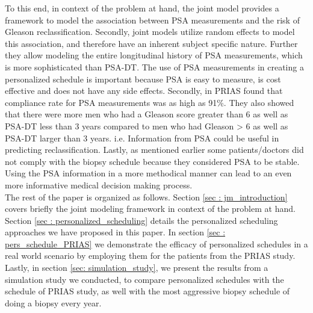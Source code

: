 To this end, in context of the problem at hand, the joint model provides a framework to model the association between PSA measurements and the risk of Gleason reclassification. Secondly, joint models utilize random effects to model this association, and therefore have an inherent subject specific nature. Further they allow modeling the entire longitudinal history of PSA measurements, which is more sophisticated than PSA-DT. The use of PSA measurements in creating a personalized schedule is important because PSA is easy to measure, is cost effective and does not have any side effects. Secondly, in PRIAS \cite{bokhorst2015compliance} found that compliance rate for PSA measurements was as high as 91\%. They also showed that there were more men who had a Gleason score greater than 6 as well as PSA-DT less than 3 years compared to men who had Gleason > 6 as well as PSA-DT larger than 3 years. i.e. Information from PSA could be useful in predicting reclassification. Lastly, as mentioned earlier some patients/doctors did not comply with the biopsy schedule because they considered PSA to be stable. Using the PSA information in a more methodical manner can lead to an even more informative medical decision making process.\\

The rest of the paper is organized as follows. Section \ref{sec : jm_introduction} covers briefly the joint modeling framework in context of the problem at hand. Section \ref{sec : personalized_scheduling} details the personalized scheduling approaches we have proposed in this paper. In section \ref{sec : pers_schedule_PRIAS} we demonstrate the efficacy of personalized schedules in a real world scenario by employing them for the patients from  the PRIAS study. Lastly, in section \ref{sec: simulation_study}, we present the results from a simulation study we conducted, to compare personalized schedules with the schedule of PRIAS study, as well with the most aggressive biopsy schedule of doing a biopsy every year.